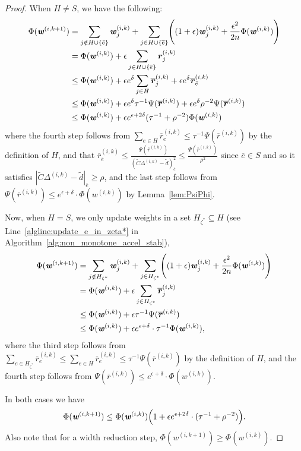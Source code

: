 \documentclass[11pt]{article}
\let\originalleft\left
\let\originalright\right
\renewcommand{\left}{\mathopen{}\mathclose\bgroup\originalleft}
\renewcommand{\right}{\aftergroup\egroup\originalright}
\newcommand\dd{\boldsymbol{\mathit{d}}}
\newcommand\rr{\boldsymbol{\mathit{r}}}
\newcommand\ww{\boldsymbol{\mathit{w}}}
\newcommand\rrbar{\overline{\boldsymbol{\mathit{r}}}}
\newcommand\CC{\boldsymbol{\mathit{C}}}
\newcommand{\wt}{\widetilde}
\newcommand{\ov}{\overline}
\begin{document}
\begin{proof}
When $H\neq S$, we have the following: 
\begin{align*}
 \Phi(\ww^{(i,k+1)}) 
& = \sum_{j \notin H\cup \{\bar{e}\}}  \ww_j^{(i,k)} + \sum_{j \in H \cup\{\ov{e}\}} \left( (1+\epsilon)\ww_j^{(i,k)} +\frac{\epsilon^2 }{2n}\Phi(\ww^{(i,k)})\right) \\
& = \Phi(\ww^{(i,k)}) + \epsilon \sum_{j \in H \cup \{\ov{e}\}} \rr_j^{(i,k)} \\
& \leq \Phi(\ww^{(i,k)})+ \epsilon e^{\delta} \sum_{j \in H}  \rrbar_j^{(i,k)} + \epsilon e^{\delta} \rrbar^{(i,k)}_{\bar{e}}\\
& \leq\Phi(\ww^{(i,k)}) + \epsilon e^{\delta} \tau^{-1} \Psi(\rrbar^{(i,k)}) + \epsilon e^{\delta} \rho^{-2} \Psi(\rrbar^{(i,k)}) \\
& \leq \Phi(\ww^{(i,k)}) + \epsilon e^{\epsilon+2\delta} (\tau^{-1} + \rho^{-2}) \Phi(\ww^{(i,k)}) 
\end{align*}
where the fourth step follows from $\sum_{e\in H}\rrbar_e^{(i,k)}\leq \tau^{-1}\Psi(\rrbar^{(i,k)})$ by the definition of $H$, and that $\ov{\rr}_{\ov{e}}^{(i,k)} \leq \frac{\Psi(\ov{\rr}^{(i,k)})}{(\wt{\CC} \Delta^{(i,k)} - \wt{\dd})_{\ov{e}}^2} \leq \frac{\Psi(\ov{\rr}^{(i,k)})}{\rho^2}$ since $\ov{e} \in S$ and so it satisfies $|\wt{\CC} \Delta^{(i,k)} - \wt{\dd}|_{\ov{e}} \geq \rho$, and the last step follows from $\Psi(\ov{\rr}^{(i,k)}) \leq e^{\epsilon+\delta} \cdot \Phi(\ww^{(i,k)})$ by Lemma~\ref{lem:PsiPhi}.



Now, when $H = S$, we only update weights in a set $H_{\zeta^*} \subseteq H$ (see Line~\ref{algline:update_e_in_zeta*} in Algorithm~\ref{alg:non_monotone_accel_stab}), 
\begin{align*}
\Phi(\ww^{(i,k+1)}) & = \sum_{j \notin H_{\zeta^*}}  \ww_j^{(i,k)} + \sum_{j \in H_{\zeta^*}} \left( (1+ \epsilon )\ww_j^{(i,k)} +\frac{ \epsilon^2 }{2n}\Phi(\ww^{(i,k)})\right) \\
& = \Phi(\ww^{(i,k)}) + \epsilon \sum_{j \in H_{\zeta^*}} \ov{\rr}_j^{(i,k)} \\
& \leq \Phi(\ww^{(i,k)}) + \epsilon \tau^{-1} \Psi(\ov{\rr}^{(i,k)}) \\
& \leq \Phi(\ww^{(i,k)}) + \epsilon e^{\epsilon+\delta} \cdot \tau^{-1} \Phi(\ww^{(i,k)}),
\end{align*}
where the third step follows from $\sum_{e\in H_{\zeta^*}}\rrbar_e^{(i,k)} \leq \sum_{e\in H}\rrbar_e^{(i,k)}\leq \tau^{-1}\Psi(\rrbar^{(i,k)}) $ by the definition of $H$, and the fourth step follows from $\Psi(\rrbar^{(i,k)}) \leq e^{\epsilon+\delta} \cdot \Phi(\ww^{(i,k)})$. 


In both cases we have 
\[
\Phi(\ww^{(i,k+1)})\leq \Phi(\ww^{(i,k)})\left(1 + \epsilon e^{\epsilon+2\delta} \cdot (\tau^{-1} + \rho^{-2})\right).
\]
Also note that for a width reduction step, $\Phi(\ww^{(i,k+1)}) \geq \Phi(\ww^{(i,k)})$.
\end{proof}
\end{document}

